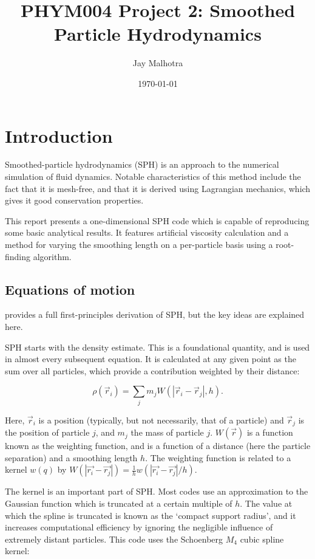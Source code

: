 \documentclass[onecolumn,12pt]{article}
\title{PHYM004 Project 2: Smoothed Particle Hydrodynamics}
\author{Jay Malhotra}
\date{\today}
\begin{document}
\newcommand{\dist}[2]{\ensuremath{|\vec{#1} - \vec{#2}|}}
\maketitle

\section{Introduction}
Smoothed-particle hydrodynamics (SPH) is an approach to the numerical simulation of fluid dynamics. Notable characteristics of this method include the fact that it is mesh-free, and that it is derived using Lagrangian mechanics, which gives it good conservation properties.

This report presents a one-dimensional SPH code which is capable of reproducing some basic analytical results. It features artificial viscosity calculation and a method for varying the smoothing length on a per-particle basis using a root-finding algorithm.

\subsection{Equations of motion}
\citet{price} provides a full first-principles derivation of SPH, but the key ideas are explained here.

SPH starts with the density estimate. This is a foundational quantity, and is used in almost every subsequent equation. It is calculated at any given point as the sum over all particles, which provide a contribution weighted by their distance:

\begin{equation}
    \rho(\vec{r}_i) = \sum\limits_j m_j W(|\vec{r}_i - \vec{r}_j|, h).
\end{equation}

Here, $\vec{r}_i$ is a position (typically, but not necessarily, that of a particle) and $\vec{r}_j$ is the position of particle $j$, and $m_j$ the mass of particle $j$. $W(\vec{r})$ is a function known as the weighting function, and is a function of a distance (here the particle separation) and a smoothing length $h$. The weighting function is related to a kernel $w(q)$ by $W(\dist{r_i}{r_j}) = \frac{1}{h}w(\dist{r_i}{r_j}/h)$.

The kernel is an important part of SPH. Most codes use an approximation to the Gaussian function which is truncated at a certain multiple of $h$. The value at which the spline is truncated is known as the `compact support radius', and it increases computational efficiency by ignoring the negligible influence of extremely distant particles. This code uses the Schoenberg $M_4$ cubic spline kernel:
\end{document}
